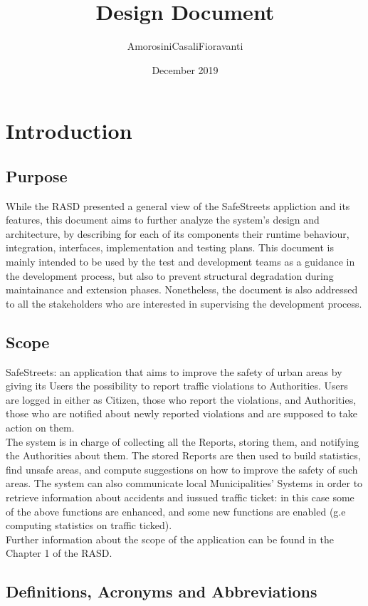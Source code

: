\documentclass{report}
\title{Design Document}
\author{AmorosiniCasaliFioravanti}
\date{December 2019}
\begin{document}


\chapter{Introduction}
\section{Purpose}
While the RASD presented a general view of the SafeStreets appliction and its features, this document aims to further analyze the system's design and architecture, by describing for each of its components their runtime behaviour, integration, interfaces, implementation and testing plans.
This document is mainly intended to be used by the test and development teams as a guidance in the development process, but also to prevent structural degradation during maintainance and extension phases. Nonetheless, the document is also addressed to all the stakeholders who are interested in supervising the development process.

\section{Scope}
SafeStreets: an application that aims to improve the safety of urban areas by giving its Users the possibility to report traffic violations to Authorities. Users are logged in either as Citizen, those who report the violations, and Authorities, those who are notified about newly reported violations and are supposed to take action on them.\\
The system is in charge of collecting all the Reports, storing them, and notifying the Authorities about them. The stored Reports are then used to build statistics, find unsafe areas, and compute suggestions on how to improve the safety of such areas. The system can also communicate local Municipalities' Systems in order to retrieve information about accidents and iussued traffic ticket: in this case some of the above functions are enhanced, and some new functions are enabled (g.e computing statistics on traffic ticked).\\
\newline
Further information about the scope of the application can be found in the Chapter 1 of the RASD.

\section{Definitions, Acronyms and Abbreviations}
\end{document}

